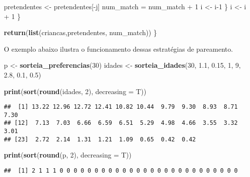 \documentclass[]{book}
\newenvironment{Shaded}{\begin{snugshade}}{\end{snugshade}}
\newcommand{\KeywordTok}[1]{\textcolor[rgb]{0.13,0.29,0.53}{\textbf{{#1}}}}
\newcommand{\DataTypeTok}[1]{\textcolor[rgb]{0.13,0.29,0.53}{{#1}}}
\newcommand{\DecValTok}[1]{\textcolor[rgb]{0.00,0.00,0.81}{{#1}}}
\newcommand{\FloatTok}[1]{\textcolor[rgb]{0.00,0.00,0.81}{{#1}}}
\newcommand{\StringTok}[1]{\textcolor[rgb]{0.31,0.60,0.02}{{#1}}}
\newcommand{\NormalTok}[1]{{#1}}
\begin{document}
\begin{Shaded}
\begin{Highlighting}[]
      \NormalTok{pretendentes <-}\StringTok{ }\NormalTok{pretendentes[-j]}
      \NormalTok{num_match =}\StringTok{ }\NormalTok{num_match +}\StringTok{ }\DecValTok{1}
      \NormalTok{i <-}\StringTok{ }\NormalTok{i}\DecValTok{-1}
    \NormalTok{\}}
    \NormalTok{i <-}\StringTok{ }\NormalTok{i +}\StringTok{ }\DecValTok{1}
  \NormalTok{\}}

  \KeywordTok{return}\NormalTok{(}\KeywordTok{list}\NormalTok{(criancas,pretendentes, num_match))}
\NormalTok{\}}
\end{Highlighting}
\end{Shaded}

O exemplo abaixo ilustra o funcionamento dessas estratégias de
pareamento.

\begin{Shaded}
\begin{Highlighting}[]
\NormalTok{p <-}\StringTok{ }\KeywordTok{sorteia_preferencias}\NormalTok{(}\DecValTok{30}\NormalTok{)}
\NormalTok{idades <-}\StringTok{ }\KeywordTok{sorteia_idades}\NormalTok{(}\DecValTok{30}\NormalTok{, }\FloatTok{1.1}\NormalTok{, }\FloatTok{0.15}\NormalTok{, }\DecValTok{1}\NormalTok{, }\DecValTok{9}\NormalTok{, }\FloatTok{2.8}\NormalTok{, }\FloatTok{0.1}\NormalTok{, }\FloatTok{0.5}\NormalTok{)}

\KeywordTok{print}\NormalTok{(}\KeywordTok{sort}\NormalTok{(}\KeywordTok{round}\NormalTok{(idades, }\DecValTok{2}\NormalTok{), }\DataTypeTok{decreasing =} \NormalTok{T))}
\end{Highlighting}
\end{Shaded}

\begin{verbatim}
##  [1] 13.22 12.96 12.72 12.41 10.82 10.44  9.79  9.30  8.93  8.71  7.30
## [12]  7.13  7.03  6.66  6.59  6.51  5.29  4.98  4.66  3.55  3.32  3.01
## [23]  2.72  2.14  1.31  1.21  1.09  0.65  0.42  0.42
\end{verbatim}

\begin{Shaded}
\begin{Highlighting}[]
\KeywordTok{print}\NormalTok{(}\KeywordTok{sort}\NormalTok{(}\KeywordTok{round}\NormalTok{(p, }\DecValTok{2}\NormalTok{), }\DataTypeTok{decreasing =} \NormalTok{T))}
\end{Highlighting}
\end{Shaded}

\begin{verbatim}
##  [1] 2 1 1 1 0 0 0 0 0 0 0 0 0 0 0 0 0 0 0 0 0 0 0 0 0 0 0 0 0 0
\end{verbatim}
\end{document}

